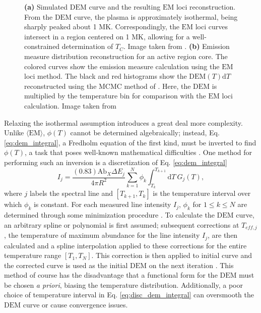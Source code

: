 \begin{figure}[ht]
{	\label{fig:dem_example}}
	\caption{\textbf{(a)} Simulated $\mathrm{DEM}$ curve and the resulting $\mathrm{EM}$ loci reconstruction. From the $\mathrm{DEM}$ curve, the plasma is approximately isothermal, being sharply peaked about 1 MK. Correspondingly, the $\mathrm{EM}$ loci curves intersect in a region centered on 1 MK, allowing for a well-constrained determination of $T_C$. Image taken from \citet{landi_isothermality_2010}. \textbf{(b)} Emission measure distribution reconstruction for an active region core. The colored curves show the emission measure calculation using the $\mathrm{EM}$ loci method. The black and red histograms show the $\mathrm{DEM}(T)\mathrm{d}T$ reconstructed using the MCMC method of \citet{kashyap_markov-chain_1998}. Here, the $\mathrm{DEM}$ is multiplied by the temperature bin for comparison with the $\mathrm{EM}$ loci calculation. Image taken from \citet{warren_constraints_2011}}
	\label{fig:dem_em_loci_example}
\end{figure}
%
\par Relaxing the isothermal assumption introduces a great deal more complexity. Unlike $\langle\mathrm{EM}\rangle$, $\phi(T)$ cannot be determined algebraically; instead, Eq. \ref{eq:dem_integral}, a Fredholm equation of the first kind, must be inverted to find $\phi(T)$, a task that poses well-known mathematical difficulties \citep{kashyap_markov-chain_1998}. One method for performing such an inversion is a discretization of Eq. \ref{eq:dem_integral}
\begin{equation}
	\label{eq:disc_dem_integral}
	I_j = \frac{(0.83)\mathrm{Ab}_X\Delta E_j}{4\pi R^2}\sum_{k=1}^N\phi_k\int^{T_{k+1}}_{T_k}\mathrm{d}T~G_j(T),
\end{equation}
where $j$ labels the spectral line and $[T_{k+1},T_k]$ is the temperature interval over which $\phi_k$ is constant. For each measured line intensity $I_j$, $\phi_k$ for $1\le k\le N$ are determined through some minimization procedure \citep{landi_monte_2012}. To calculate the $\mathrm{DEM}$ curve, an arbitrary spline or polynomial is first assumed; subsequent corrections at $T_{eff,j}$, the temperature of maximum abundance for the line intensity $I_j$, are then calculated and a spline interpolation applied to these corrections for the entire temperature range $[T_1,T_N]$. This correction is then applied to initial curve and the corrected curve is used as the initial $\mathrm{DEM}$ on the next iteration \citep{landi_monte_2012}. This method of course has the disadvantage that a functional form for the $\mathrm{DEM}$ must be chosen \textit{a priori}, biasing the temperature distribution. Additionally, a poor choice of temperature interval in Eq. \ref{eq:disc_dem_integral} can oversmooth the $\mathrm{DEM}$ curve or cause convergence issues.
